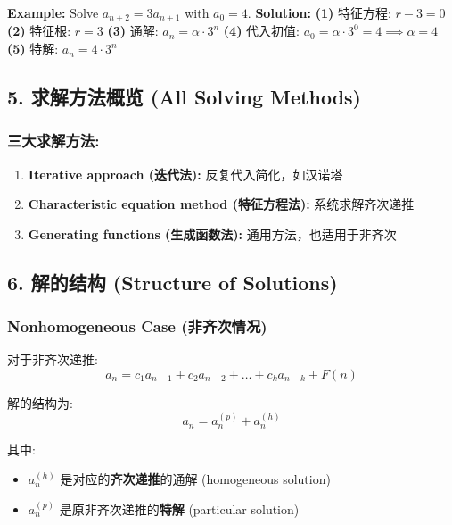 \documentclass[10pt,a4paper,openany]{ctexbook}
\theoremstyle{definition}
\theoremstyle{remark}
\begin{document}
\textbf{Example:} Solve $a_{n+2} = 3a_{n+1}$ with $a_0 = 4$.
\textbf{Solution:}
\textbf{(1)} 特征方程: $r - 3 = 0$
\textbf{(2)} 特征根: $r = 3$
\textbf{(3)} 通解: $a_n = \alpha \cdot 3^n$
\textbf{(4)} 代入初值: $a_0 = \alpha \cdot 3^0 = 4 \implies \alpha = 4$
\textbf{(5)} 特解: $a_n = 4 \cdot 3^n$
\vspace{-2pt}

\subsection{5. 求解方法概览 (All Solving Methods)}

\subsubsection{三大求解方法:}

\begin{enumerate}
\item \textbf{Iterative approach (迭代法):} 反复代入简化，如汉诺塔
\item \textbf{Characteristic equation method (特征方程法):} 系统求解齐次递推
\item \textbf{Generating functions (生成函数法):} 通用方法，也适用于非齐次

\end{enumerate}

\vspace{-2pt}

\subsection{6. 解的结构 (Structure of Solutions)}

\subsubsection{Nonhomogeneous Case (非齐次情况)}

对于非齐次递推:
\[
a_n = c_1 a_{n-1} + c_2 a_{n-2} + \dots + c_k a_{n-k} + F(n)
\]

解的结构为:
\[
a_n = a_n^{(p)} + a_n^{(h)}
\]

其中:
\begin{itemize}
\item $a_n^{(h)}$ 是对应的\textbf{齐次递推}的通解 (homogeneous solution)
\item $a_n^{(p)}$ 是原非齐次递推的\textbf{特解} (particular solution)

\end{itemize}
\end{document}

